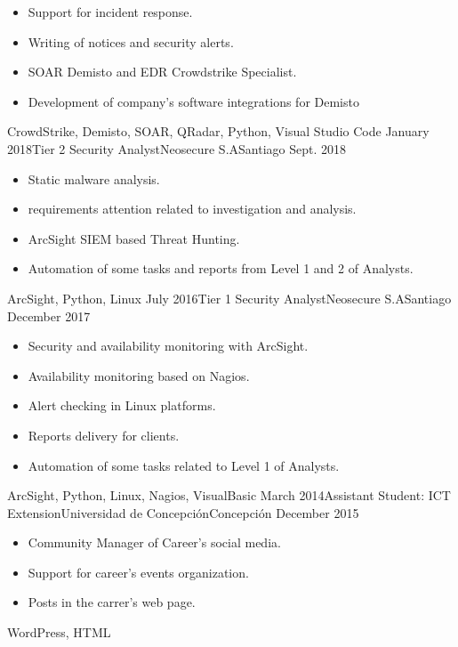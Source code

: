 \begin{experiences}
{\begin{itemize}
        \item Support for incident response.                   
        \item Writing of notices and security alerts.                          
        \item SOAR Demisto and EDR Crowdstrike Specialist.                      
        \item Development of company's software integrations for Demisto                                
      \end{itemize}
    }{CrowdStrike, Demisto, SOAR, QRadar, Python, Visual Studio Code}
  \emptySeparator
  \experience
  {January 2018}{Tier 2 Security Analyst}{Neosecure S.A}{Santiago}
  {Sept. 2018}{
    \begin{itemize}
      \item Static malware analysis.
      \item requirements attention related to investigation and analysis.
      \item ArcSight SIEM based Threat Hunting.
      \item Automation of some tasks and reports from Level 1 and 2 of Analysts.
    \end{itemize}
  }{ArcSight, Python, Linux}
  \emptySeparator
  \experience
  {July 2016}{Tier 1 Security Analyst}{Neosecure S.A}{Santiago}
  {December 2017}{
    \begin{itemize}
      \item Security and availability monitoring with ArcSight.
      \item Availability monitoring based on Nagios.
      \item Alert checking in Linux platforms.
      \item Reports delivery for clients.
      \item Automation of some tasks related to Level 1 of Analysts.
    \end{itemize}
  }{ArcSight, Python, Linux, Nagios, VisualBasic}
  \emptySeparator
  \experience
  {March 2014}{Assistant Student: ICT Extension}{Universidad de Concepción}{Concepción}
  {December 2015}{
    \begin{itemize}
      \item Community Manager of Career's social media.
      \item Support for career's events organization.
      \item Posts in the carrer's web page.
    \end{itemize}
  }{WordPress, HTML}
  \emptySeparator

\end{experiences}
